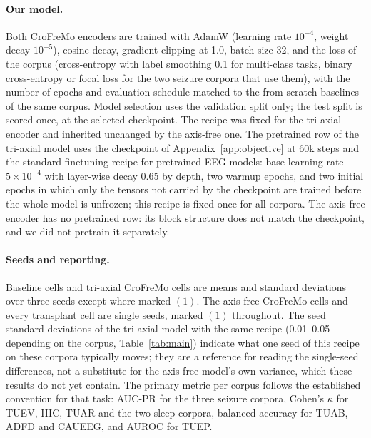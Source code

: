 \paragraph{Our model.}
Both CroFreMo encoders are trained with AdamW (learning rate $10^{-4}$,
weight decay $10^{-5}$), cosine decay, gradient clipping at 1.0, batch
size 32, and the loss of the corpus (cross-entropy with label smoothing
0.1 for multi-class tasks, binary cross-entropy or focal loss for the two
seizure corpora that use them), with the number of epochs and evaluation
schedule matched to the from-scratch baselines of the same corpus. Model
selection uses the validation split only; the test split is scored once,
at the selected checkpoint. The recipe was fixed for the tri-axial encoder
and inherited unchanged by the axis-free one. The pretrained row of the
tri-axial model uses the checkpoint of Appendix~\ref{app:objective} at 60k
steps and the standard finetuning recipe for pretrained EEG models: base
learning rate $5\times10^{-4}$ with layer-wise decay 0.65 by depth, two
warmup epochs, and two initial epochs in which only the tensors not
carried by the checkpoint are trained before the whole model is unfrozen;
this recipe is fixed once for all corpora. The axis-free encoder has no
pretrained row: its block structure does not match the checkpoint, and we
did not pretrain it separately.

\paragraph{Seeds and reporting.}
Baseline cells and tri-axial CroFreMo cells are means and standard
deviations over three seeds except where marked $(1)$. The axis-free
CroFreMo cells and every transplant cell are single seeds, marked $(1)$
throughout. The seed standard deviations of the tri-axial model with the
same recipe (0.01--0.05 depending on the corpus, Table~\ref{tab:main})
indicate what one seed of this recipe on these corpora typically moves;
they are a reference for reading the single-seed differences, not a
substitute for the axis-free model's own variance, which these results
do not yet contain. The primary metric per corpus
follows the established convention for that task: AUC-PR for the three
seizure corpora, Cohen's $\kappa$ for TUEV, IIIC, TUAR and the two sleep
corpora, balanced accuracy for TUAB, ADFD and CAUEEG, and AUROC for TUEP.

